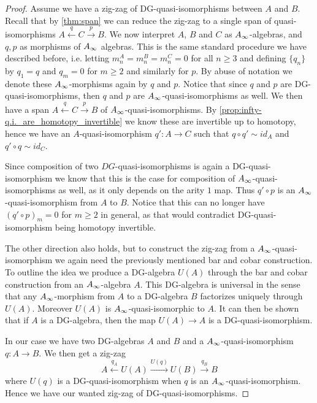 \begin{proof}
Assume we have a zig-zag of DG-quasi-isomorphisms between $A$ and $B$. Recall that by \cref{thm:span} we can reduce the zig-zag to a single span of quasi-isomorphisms $A\overset{q}\longleftarrow C\overset{p}\longrightarrow B$. We now interpret $A$, $B$ and $C$ as $A_{\infty}$-algebras, and $q, p$ as morphisms of $A_{\infty}$ algebras. This is the same standard procedure we have described before, i.e. letting $m^A_n = m^B_n = m^C_n = 0$ for all $n\geq 3$ and defining $\{q_n\}$ by $q_1 = q$ and $q_m = 0$ for $m\geq 2$ and similarly for $p$. By abuse of notation we denote these $A_{\infty}$-morphisms again by $q$ and $p$. Notice that since $q$ and $p$ are DG-quasi-isomorphisms, then $q$ and $p$ are $A_{\infty}$-quasi-isomorphisms as well. We then have a span $A\overset{q}\longleftarrow C \overset{p}\longrightarrow B$ of $A_{\infty}$-quasi-isomorphisms. By \cref{prop:infty-q.i._are_homotopy_invertible} we know these are invertible up to homotopy, hence we have an $A$-quasi-isomorphism $q'\colon A\longrightarrow C$ such that $q\circ q' \sim id_A$ and $q'\circ q \sim id_C$. 

Since composition of two $DG$-quasi-isomorphisms is again a DG-quasi-isomorphism we know that this is the case for composition of $A_{\infty}$-quasi-isomorphisms as well, as it only depends on the arity $1$ map. Thus $q'\circ p$ is an $A_{\infty}$-quasi-isomorphism from $A$ to $B$. Notice that this can no longer have $(q'\circ p)_m = 0$ for $m\geq 2$ in general, as that would contradict DG-quasi-isomorphism being homotopy invertible. 

The other direction also holds, but to construct the zig-zag from a $A_{\infty}$-quasi-isomorphism we again need the previously mentioned bar and cobar construction. To outline the idea we produce a DG-algebra $U(A)$ through the bar and cobar construction from an $A_{\infty}$-algebra $A$. This DG-algebra is universal in the sense that any $A_{\infty}$-morphism from $A$ to a DG-algebra $B$ factorizes uniquely through $U(A)$. Moreover $U(A)$ is $A_{\infty}$-quasi-isomorphic to $A$. It can then be shown that if $A$ is a DG-algebra, then the map $U(A)\longrightarrow A$ is a DG-quasi-isomorphism. 

In our case we have two DG-algebras $A$ and $B$ and a $A_{\infty}$-quasi-isomorphism $q\colon A\longrightarrow B$. We then get a zig-zag
\begin{equation*}
    A\overset{q_A}\longleftarrow U(A) \overset{U(q)}\longrightarrow U(B)\overset{q_B}\longrightarrow B
\end{equation*}
where $U(q)$ is a DG-quasi-isomorphism when $q$ is an $A_{\infty}$-quasi-isomorphism. Hence we have our wanted zig-zag of DG-quasi-isomorphisms. 
\end{proof}


